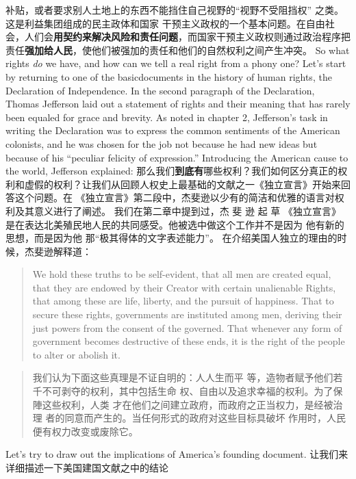 \begin{paracol}{2}
补贴，或者要求别人土地上的东西不能挡住自己视野的“视野不受阻挡权” 之类。这是利益集团组成的民主政体和国家
干预主义政权的一个基本问题。在自由社会，人们会\textbf{用契约来解决风险和责任问题}，而国家干预主义政权则通过政治程序把
责任\textbf{强加给人民}，使他们被强加的责任和他们的自然权利之间产生冲突。
\switchcolumn*
So what rights \textit{do} we have, and how can we tell a real right
from a phony one? Let's start by returning to one of the basicdocuments in the history of human rights, the Declaration of
Independence. In the second paragraph of the Declaration,
Thomas Jefferson laid out a statement of rights and their meaning that has rarely been equaled for grace and brevity. As noted
in chapter 2, Jefferson's task in writing the Declaration was to
express the common sentiments of the American colonists, and
he was chosen for the job not because he had new ideas but because of his ``peculiar felicity of expression.'' Introducing the
American cause to the world, Jefferson explained:
\switchcolumn
那么我们\textbf{到底有}哪些权利？我们如何区分真正的权利和虚假的权利？让我们从回顾人权史上最基础的文献之一《独立宣言》开始来回答这个问题。在 《独立宣言》第二段中，杰斐逊以少有的简洁和优雅的语言对权利及其意义进行了阐述。
我们在第二章中提到过，杰 斐 逊 起 草 《独立宣言》 是在表达北美殖民地人民的共同感受。他被选中做这个工作并不是因为
他有新的思想，而是因为他 那“极其得体的文字表述能力”。
在介绍美国人独立的理由的时候，杰斐逊解释道：
\switchcolumn*
\begin{quote}
	We hold these truths to be self-evident, that all men are created
equal, that they are endowed by their Creator with certain unalienable Rights, that among these are life, liberty, and the pursuit of happiness. That to secure these rights, governments are
instituted among men, deriving their just powers from the consent of the governed. That whenever any form of government
becomes destructive of these ends, it is the right of the people to
alter or abolish it.
\end{quote}
\switchcolumn
\begin{quote}
	我们认为下面这些真理是不证自明的：人人生而平
等，造物者赋予他们若千不可剥夺的权利，其中包括生命
权、自由以及追求幸福的权利。为了保陣这些权利，人类
才在他们之间建立政府，而政府之正当权力，是经被治理
者的同意而产生的。当任何形式的政府对这些目标具破坏
作用时，人民便有权力改变或废除它。
\end{quote}
\switchcolumn*
Let's try to draw out the implications of America's founding
document.
\switchcolumn
让我们来详细描述一下美国建国文献之中的结论



\end{paracol}
